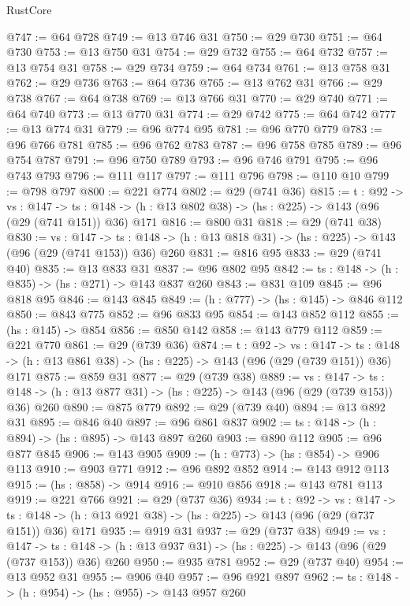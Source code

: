 \begin{lexlean}{RustCore}
\begin{coremodule}
@747 := @64 @728
@749 := @13 @746 @31
@750 := @29 @730
@751 := @64 @730
@753 := @13 @750 @31
@754 := @29 @732
@755 := @64 @732
@757 := @13 @754 @31
@758 := @29 @734
@759 := @64 @734
@761 := @13 @758 @31
@762 := @29 @736
@763 := @64 @736
@765 := @13 @762 @31
@766 := @29 @738
@767 := @64 @738
@769 := @13 @766 @31
@770 := @29 @740
@771 := @64 @740
@773 := @13 @770 @31
@774 := @29 @742
@775 := @64 @742
@777 := @13 @774 @31
@779 := @96 @774 @95
@781 := @96 @770 @779
@783 := @96 @766 @781
@785 := @96 @762 @783
@787 := @96 @758 @785
@789 := @96 @754 @787
@791 := @96 @750 @789
@793 := @96 @746 @791
@795 := @96 @743 @793
@796 := @111 @117
@797 := @111 @796
@798 := @110 @10
@799 := @798 @797
@800 := @221 @774
@802 := @29 (@741 @36)
@815 := {t : @92} ->
  {vs : @147} ->
  {ts : @148} -> (h : @13 @802 @38) -> (hs : @225) -> @143 (@96 (@29 (@741 @151)) @36) @171
@816 := @800 @31
@818 := @29 (@741 @38)
@830 := {vs : @147} ->
  {ts : @148} -> (h : @13 @818 @31) -> (hs : @225) -> @143 (@96 (@29 (@741 @153)) @36) @260
@831 := @816 @95
@833 := @29 (@741 @40)
@835 := @13 @833 @31
@837 := @96 @802 @95
@842 := {ts : @148} -> (h : @835) -> (hs : @271) -> @143 @837 @260
@843 := @831 @109
@845 := @96 @818 @95
@846 := @143 @845
@849 := (h : @777) -> (hs : @145) -> @846 @112
@850 := @843 @775
@852 := @96 @833 @95
@854 := @143 @852 @112
@855 := (hs : @145) -> @854
@856 := @850 @142
@858 := @143 @779 @112
@859 := @221 @770
@861 := @29 (@739 @36)
@874 := {t : @92} ->
  {vs : @147} ->
  {ts : @148} -> (h : @13 @861 @38) -> (hs : @225) -> @143 (@96 (@29 (@739 @151)) @36) @171
@875 := @859 @31
@877 := @29 (@739 @38)
@889 := {vs : @147} ->
  {ts : @148} -> (h : @13 @877 @31) -> (hs : @225) -> @143 (@96 (@29 (@739 @153)) @36) @260
@890 := @875 @779
@892 := @29 (@739 @40)
@894 := @13 @892 @31
@895 := @846 @40
@897 := @96 @861 @837
@902 := {ts : @148} -> (h : @894) -> (hs : @895) -> @143 @897 @260
@903 := @890 @112
@905 := @96 @877 @845
@906 := @143 @905
@909 := (h : @773) -> (hs : @854) -> @906 @113
@910 := @903 @771
@912 := @96 @892 @852
@914 := @143 @912 @113
@915 := (hs : @858) -> @914
@916 := @910 @856
@918 := @143 @781 @113
@919 := @221 @766
@921 := @29 (@737 @36)
@934 := {t : @92} ->
  {vs : @147} ->
  {ts : @148} -> (h : @13 @921 @38) -> (hs : @225) -> @143 (@96 (@29 (@737 @151)) @36) @171
@935 := @919 @31
@937 := @29 (@737 @38)
@949 := {vs : @147} ->
  {ts : @148} -> (h : @13 @937 @31) -> (hs : @225) -> @143 (@96 (@29 (@737 @153)) @36) @260
@950 := @935 @781
@952 := @29 (@737 @40)
@954 := @13 @952 @31
@955 := @906 @40
@957 := @96 @921 @897
@962 := {ts : @148} -> (h : @954) -> (hs : @955) -> @143 @957 @260

\end{coremodule}
\end{lexlean}
